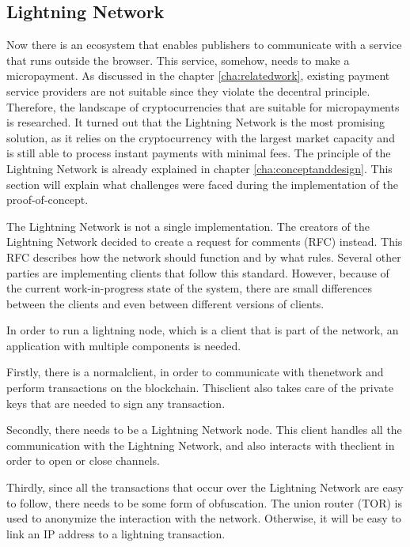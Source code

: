 \subsection{Lightning Network}
\label{sec:lightningnetwork}

Now there is an ecosystem that enables publishers to communicate with a service that runs outside the browser. This service, somehow, needs to make a micropayment. As discussed in the chapter \ref{cha:relatedwork}, existing payment service providers are not suitable since they violate the decentral principle. Therefore, the landscape of cryptocurrencies that are suitable for micropayments is researched. It turned out that the Lightning Network is the most promising solution, as it relies on the cryptocurrency with the largest market capacity and is still able to process instant payments with minimal fees. The principle of the Lightning Network is already explained in chapter \ref{cha:conceptanddesign}. This section will explain what challenges were faced during the implementation of the proof-of-concept.

The Lightning Network is not a single implementation. The creators of the Lightning Network decided to create a request for comments (RFC) instead. This RFC describes how the network should function and by what rules. Several other parties are implementing clients that follow this standard. However, because of the current work-in-progress state of the system, there are small differences between the clients and even between different versions of clients. 

In order to run a lightning node, which is a client that is part of the network, an application with multiple components is needed. 

Firstly, there is a normalclient, in order to communicate with thenetwork and perform transactions on the blockchain. Thisclient also takes care of the private keys that are needed to sign any transaction.

Secondly, there needs to be a Lightning Network node. This client handles all the communication with the Lightning Network, and also interacts with theclient in order to open or close channels. 

Thirdly, since all the transactions that occur over the Lightning Network are easy to follow, there needs to be some form of obfuscation. The union router (TOR) is used to anonymize the interaction with the network. Otherwise, it will be easy to link an IP address to a lightning transaction.

